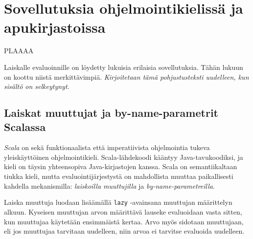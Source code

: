 
\section{Sovellutuksia ohjelmointikielissä ja apukirjastoissa}\label{sovellutuksia}

PLAAAA

Laiskalle evaluoinnille on löydetty lukuisia erilaisia sovellutuksia. Tähän lukuun on koottu niistä merkittävimpiä. \textit{Kirjoitetaan tämä pohjustusteksti uudelleen, kun sisältö on selkeytynyt.}

\subsection{Laiskat muuttujat ja by-name-parametrit Scalassa}

\textit{Scala} on sekä funktionaalista että imperatiivista ohjelmointia tukeva yleiskäyttöinen ohjelmointikieli. Scala-lähdekoodi kääntyy Java-tavukoodiksi, ja kieli on täysin yhteensopiva Java-kirjastojen kanssa. Scala on semantiikaltaan tiukka kieli, mutta evaluointijärjestystä on mahdollista muuttaa paikallisesti kahdella mekanismilla: \textit{laiskoilla muuttujilla} ja \textit{by-name-parametreilla}.

Laiska muuttuja luodaan lisäämällä \verb!lazy! -avainsana muuttujan määrittelyn alkuun. Kyseisen muuttujan arvon määrittävä lauseke evaluoidaan vasta sitten, kun muuttujaa käytetään ensimmäistä kertaa. Arvo myös sidotaan muuttujaan, eli jos muuttujaa tarvitaan uudelleen, niin arvoa ei tarvitse evaluoida uudelleen.

